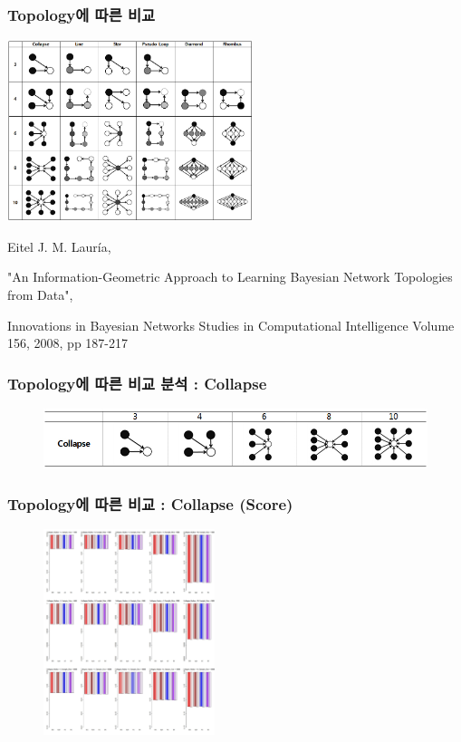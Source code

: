 \documentclass{beamer}
\begin{document}
\begin{frame}
\frametitle{Topology에 따른 비교}
{\scriptsize{}
	\begin{center}
		\includegraphics[height=150pt]{images/image21}
	\end{center}		
}
\tiny{
		Eitel J. M. Lauría,
		
		"An Information-Geometric Approach to Learning Bayesian Network Topologies from Data",
		
		Innovations in Bayesian Networks Studies in Computational Intelligence Volume 156, 2008, pp 187-217
		}
\end{frame}


\begin{frame}
\frametitle{Topology에 따른 비교 분석 : Collapse}
{\scriptsize{}
	\begin{figure}
		\includegraphics[height=50pt]{images/Topologies_Collapse}
	\end{figure}	
}
\end{frame}



\begin{frame}
\frametitle{Topology에 따른 비교 : Collapse (Score)}
{\scriptsize{}
	\begin{figure}
		\includegraphics[height=170pt]{images/01_Collapse_Score}
	\end{figure}	
}
\end{frame}
\end{document}
